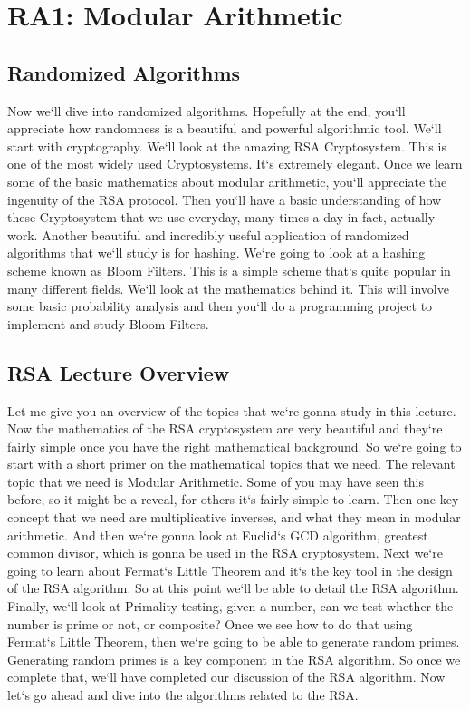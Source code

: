 \section{RA1: Modular Arithmetic}

\subsection{Randomized Algorithms}
Now we`ll dive into randomized algorithms.
Hopefully at the end, you`ll appreciate how randomness is a beautiful and powerful algorithmic tool.
We`ll start with cryptography.
We`ll look at the amazing RSA Cryptosystem.
This is one of the most widely used Cryptosystems.
It`s extremely elegant.
Once we learn some of the basic mathematics about modular arithmetic, you`ll appreciate the ingenuity of the RSA protocol.
Then you`ll have a basic understanding of how these Cryptosystem that we use everyday, many times a day in fact, actually work.
Another beautiful and incredibly useful application of randomized algorithms that we`ll study is for hashing.
We`re going to look at a hashing scheme known as Bloom Filters.
This is a simple scheme that`s quite popular in many different fields.
We`ll look at the mathematics behind it.
This will involve some basic probability analysis and then you`ll do a programming project to implement and study Bloom Filters.

\subsection{RSA  Lecture Overview}
Let me give you an overview of the topics that we`re gonna study in this lecture.
Now the mathematics of the RSA cryptosystem are very beautiful and they`re fairly simple once you have the right mathematical background.
So we`re going to start with a short primer on the mathematical topics that we need.
The relevant topic that we need is Modular Arithmetic.
Some of you may have seen this before, so it might be a reveal, for others it`s fairly simple to learn.
Then one key concept that we need are multiplicative inverses, and what they mean in modular arithmetic.
And then we`re gonna look at Euclid`s GCD algorithm, greatest common divisor, which is gonna be used in the RSA cryptosystem.
Next we`re going to learn about Fermat`s Little Theorem and it`s the key tool in the design of the RSA algorithm.
So at this point we`ll be able to detail the RSA algorithm.
Finally, we`ll look at Primality testing, given a number, can we test whether the number is prime or not, or composite? Once we see how to do that using Fermat`s Little Theorem, then we`re going to be able to generate random primes.
Generating random primes is a key component in the RSA algorithm.
So once we complete that, we`ll have completed our discussion of the RSA algorithm.
Now let`s go ahead and dive into the algorithms related to the RSA\@.

